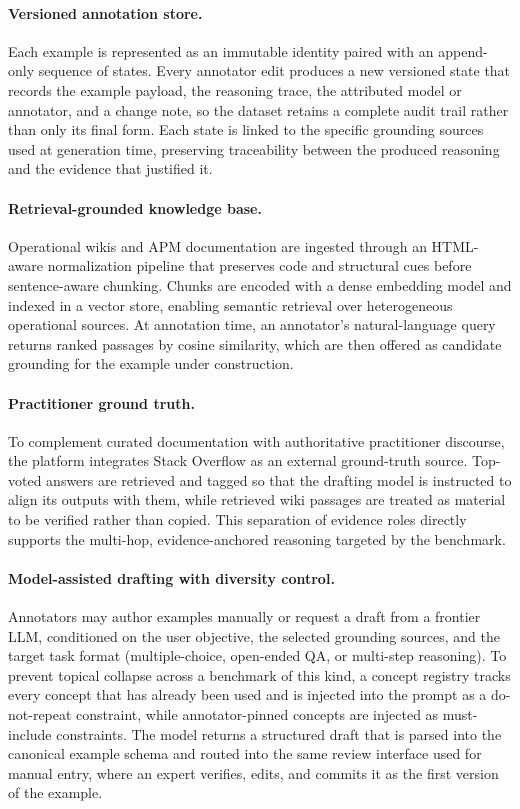 \documentclass[11pt]{article}
\begin{document}
\paragraph{Versioned annotation store.} Each example is represented as an immutable identity paired with an append-only sequence of states. Every annotator edit produces a new versioned state that records the example payload, the reasoning trace, the attributed model or annotator, and a change note, so the dataset retains a complete audit trail rather than only its final form. Each state is linked to the specific grounding sources used at generation time, preserving traceability between the produced reasoning and the evidence that justified it.

\paragraph{Retrieval-grounded knowledge base.} Operational wikis and APM documentation are ingested through an HTML-aware normalization pipeline that preserves code and structural cues before sentence-aware chunking. Chunks are encoded with a dense embedding model and indexed in a vector store, enabling semantic retrieval over heterogeneous operational sources. At annotation time, an annotator's natural-language query returns ranked passages by cosine similarity, which are then offered as candidate grounding for the example under construction.

\paragraph{Practitioner ground truth.} To complement curated documentation with authoritative practitioner discourse, the platform integrates Stack Overflow as an external ground-truth source. Top-voted answers are retrieved and tagged so that the drafting model is instructed to align its outputs with them, while retrieved wiki passages are treated as material to be verified rather than copied. This separation of evidence roles directly supports the multi-hop, evidence-anchored reasoning targeted by the benchmark.

\paragraph{Model-assisted drafting with diversity control.} Annotators may author examples manually or request a draft from a frontier LLM, conditioned on the user objective, the selected grounding sources, and the target task format (multiple-choice, open-ended QA, or multi-step reasoning). To prevent topical collapse across a benchmark of this kind, a concept registry tracks every concept that has already been used and is injected into the prompt as a do-not-repeat constraint, while annotator-pinned concepts are injected as must-include constraints. The model returns a structured draft that is parsed into the canonical example schema and routed into the same review interface used for manual entry, where an expert verifies, edits, and commits it as the first version of the example.
\end{document}
